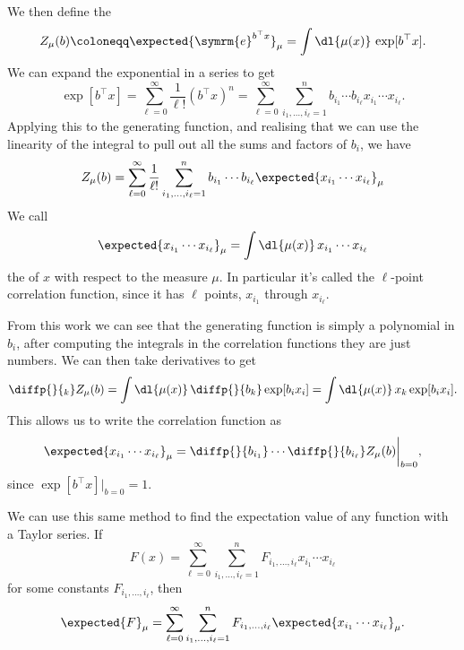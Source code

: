 \documentclass[fleqn]{NotesClass}
\newcommand{\e}{\symrm{e}}
\newcommand{\trans}{{\top}}
\begin{document}
    We then define the 
    \begin{equation}
        Z_\mu(b) \coloneqq \expected{\e^{b^\trans x}}_\mu = \int \dl{\mu(x)} \, \exp[b^\trans x].
    \end{equation}
    We can expand the exponential in a series to get
    \begin{equation}
        \exp[b^\trans x] = \sum_{\ell = 0}^{\infty} \frac{1}{\ell!} (b^\trans x)^n = \sum_{\ell = 0}^{\infty} \sum_{i_1, \dotsc, i_{\ell} = 1}^{n} b_{i_1}\dotsm b_{i_\ell} x_{i_1} \dotsm x_{i_\ell}.
    \end{equation}
    Applying this to the generating function, and realising that we can use the linearity of the integral to pull out all the sums and factors of \(b_i\), we have
    \begin{equation}
        Z_\mu(b) = \sum_{\ell = 0}^{\infty} \frac{1}{\ell!} \sum_{i_1, \dotsc, i_\ell = 1}^{n} b_{i_1} \dotsm b_{i_\ell} \expected{x_{i_1} \dotsm x_{i_\ell}}_\mu
    \end{equation}
    We call
    \begin{equation}
        \expected{x_{i_1} \dotsm x_{i_\ell}}_\mu = \int \dl{\mu(x)} \, x_{i_1} \dotsm x_{i_\ell}
    \end{equation}
    the  of \(x\) with respect to the measure \(\mu\).
    In particular it's called the \(\ell\)-point correlation function, since it has \(\ell\) points, \(x_{i_1}\) through \(x_{i_\ell}\).
    
    From this work we can see that the generating function is simply a polynomial in \(b_i\), after computing the integrals in the correlation functions they are just numbers.
    We can then take derivatives to get
    \begin{equation}
        \diffp{}{_k} Z_\mu(b) = \int \dl{\mu(x)} \, \diffp{}{b_k} \exp[b_ix_i] = \int \dl{\mu(x)} \, x_k \exp[b_ix_i].
    \end{equation}
    This allows us to write the correlation function as
    \begin{equation}
        \expected{x_{i_1} \dotsm x_{i_\ell}}_\mu = \diffp{}{b_{i_1}} \dotsm \diffp{}{b_{i_\ell}} Z_\mu(b) \bigg|_{b = 0},
    \end{equation}
    since \(\exp[b^\trans x]|_{b = 0} = 1\).
    
    We can use this same method to find the expectation value of any function with a Taylor series.
    If
    \begin{equation}\label{eqn:taylor series}
        F(x) = \sum_{\ell = 0}^{\infty} \sum_{i_1, \dotsc, i_{\ell} = 1}^{n} F_{i_1, \dotsc, i_{\ell}} x_{i_1} \dotsm x_{i_\ell}
    \end{equation}
    for some constants \(F_{i_1, \dotsc, i_{\ell}}\), then
    \begin{equation}
        \expected{F}_\mu = \sum_{\ell = 0}^{\infty} \sum_{i_1, \dotsc, i_{\ell} = 1}^{n} F_{i_1, \dotsc, i_{\ell}} \expected{x_{i_1} \dotsm x_{i_\ell}}_\mu.
    \end{equation}
    
\end{document}
